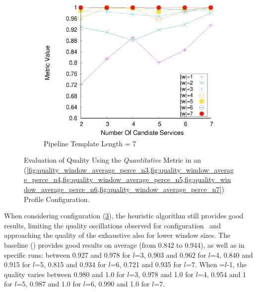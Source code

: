 \begin{figure}[ht!]
\begin{subfigure}{0.49\textwidth}
        \label{fig:quality_window_average_perce_n6}
      \end{subfigure}
      \hfill
      \begin{subfigure}{0.49\textwidth}
        \includegraphics[width=\textwidth]{Images/graphs/window_quality_performance_diff_perce_n7_s7_50_89_n7}
        \caption{Pipeline Template Length = 7}
        \label{fig:quality_window_average_perce_n7}
      \end{subfigure}


      \caption{Evaluation of Quality Using the \emph{Quantitative} Metric in an \average (\cref{fig:quality_window_average_perce_n3,fig:quality_window_average_perce_n4,fig:quality_window_average_perce_n5,fig:quality_window_average_perce_n6,fig:quality_window_average_perce_n7}) Profile Configuration.}  \label{fig:quality_window_perce_average}

    \end{figure}

    When considering configuration \average (\cref{fig:quality_window_perce_average}), the heuristic algorithm still provides good results, limiting the quality oscillations observed for configuration \wide\ and approaching the quality of the exhaustive also for lower window sizes. The baseline () provides good results on average (from 0.842 to 0.944), as well as in specific runs: between 0.927 and 0.978 for $l$=3, 0.903 and 0.962 for $l$=4, 0.840 and 0.915 for $l$=5, 0.815 and 0.934 for $l$=6, 0.721 and 0.935 for $l$=7.
    When \windowsize=$l$-1, the quality varies between 0.980 and 1.0 for $l$=3, 0.978 and 1.0 for $l$=4, 0.954 and 1 for $l$=5, 0.987 and 1.0 for $l$=6, 0.990 and 1.0 for $l$=7.


